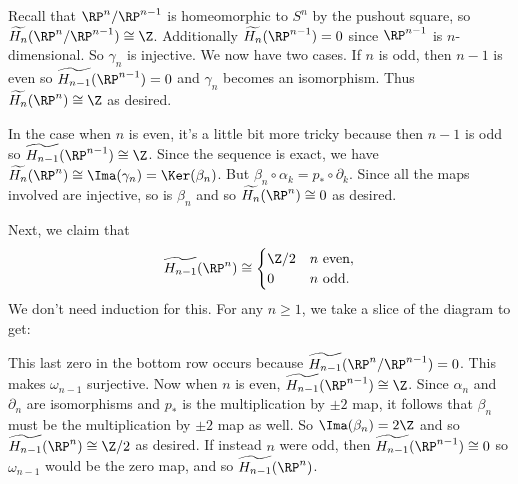 \documentclass[11pt,letterpaper]{article}
\begin{document}
\begin{solution}
    \begin{center}
    \end{center}

    Recall that $\RP^n /\RP^{n-1}$ is homeomorphic to $S^n$ by the pushout square, so $\widetilde{H_n}(\RP^n/\RP^{n-1})\cong \Z$. Additionally $\widetilde{H_n}(\RP^{n-1})=0$ since $\RP^{n-1}$ is $n$-dimensional. So $\gamma_n$ is injective. We now have two cases. If $n$ is odd, then $n-1$ is even so $\widetilde{H_{n-1}}(\RP^{n-1})=0$ and $\gamma_n$ becomes an isomorphism. Thus $\widetilde{H_n}(\RP^n)\cong \Z$ as desired.    

    \quad In the case when $n$ is even, it's a little bit more tricky because then $n-1$ is odd so $\widetilde{H_{n-1}}(\RP^{n-1})\cong \Z$. Since the sequence is exact, we have $\widetilde{H_n}(\RP^n)\cong \Ima(\gamma_n)=\Ker(\beta_n)$. But $\beta_n\circ \alpha_k = p_*\circ \partial_k$. Since all the maps involved are injective, so is $\beta_n$ and so $\widetilde{H_n}(\RP^n)\cong 0$ as desired.
    
    \quad Next, we claim that 
    \[
        \widetilde{H_{n-1}}(\RP^n) \cong \begin{cases}
            \Z /2& n\text{ even},\\
            0 & n\text{ odd}.
        \end{cases}
    \] 
    We don't need induction for this. For any $n\geq 1$, we take a slice of the diagram to get:
    \begin{center}
    \end{center}
    \quad This last zero in the bottom row occurs because $\widetilde{H_{n-1}}(\RP^n/\RP^{n-1})=0$. This makes $\omega_{n-1}$ surjective. Now when $n$ is even, $\widetilde{H_{n-1}}(\RP^{n-1})\cong \Z$. Since $\alpha_n$ and $\partial_n$ are isomorphisms and $p_*$ is the multiplication by $\pm 2$ map, it follows that $\beta_n$ must be the multiplication by $\pm 2$ map as well. So $\Ima(\beta_n)=2\Z$ and so $\widetilde{H_{n-1}}(\RP^n)\cong \Z /2$ as desired. If instead $n$ were odd, then $\widetilde{H_{n-1}}(\RP^{n-1})\cong 0$ so $\omega_{n-1}$ would be the zero map, and so $\widetilde{H_{n-1}}(\RP^n)$. 
    

\end{solution}
\end{document}
